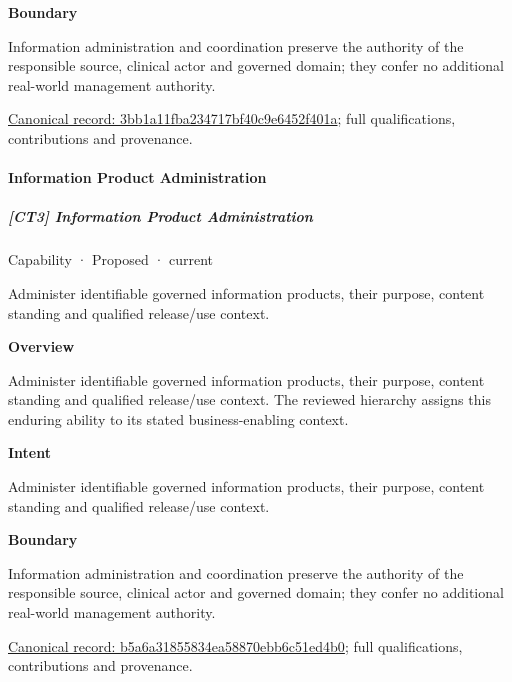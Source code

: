 \textbf{Boundary}



Information administration and coordination preserve the authority of the responsible source, clinical actor and governed domain; they confer no additional real-world management authority.


{\footnotesize \href{../../../../continuum/strategy/capability/3bb1a11fba234717bf40c9e6452f401a.md}{Canonical record: 3bb1a11fba234717bf40c9e6452f401a}; full qualifications, contributions and provenance.}\par
\paragraph{Information Product Administration}

\subparagraph{[CT3] Information Product Administration}

\label{element:b5a6a31855834ea58870ebb6c51ed4b0}
{\small Capability · Proposed · current}\par

Administer identifiable governed information products, their purpose, content standing and qualified release/use context.



\textbf{Overview}



Administer identifiable governed information products, their purpose, content standing and qualified release/use context. The reviewed hierarchy assigns this enduring ability to its stated business-enabling context.



\textbf{Intent}



Administer identifiable governed information products, their purpose, content standing and qualified release/use context.



\textbf{Boundary}



Information administration and coordination preserve the authority of the responsible source, clinical actor and governed domain; they confer no additional real-world management authority.


{\footnotesize \href{../../../../continuum/strategy/capability/b5a6a31855834ea58870ebb6c51ed4b0.md}{Canonical record: b5a6a31855834ea58870ebb6c51ed4b0}; full qualifications, contributions and provenance.}\par
